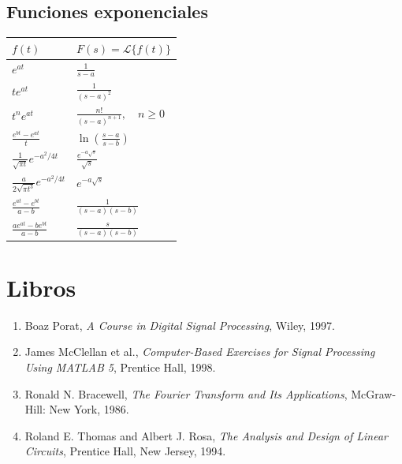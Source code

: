\subsection{Funciones exponenciales}

\begin{center}
	\renewcommand{\arraystretch}{1.8}
	\begin{tabular}{ll}
		\textbf{$f(t)$} & \textbf{$F(s) = \mathcal{L}\{f(t)\}$} \\ \hline
		$e^{at}$ & $\frac{1}{s-a}$ \\ 
		$t e^{at}$ & $\frac{1}{(s-a)^{2}}$ \\ 
		$t^n e^{at}$ & $\frac{n!}{(s-a)^{n+1}}, \quad n\geq 0$ \\ 
		$\frac{e^{bt}-e^{at}}{t}$ & $\ln \left( \frac{s-a}{s-b} \right)$ \\
		$\frac{1}{\sqrt{\pi t}}e^{-a^{2}/4t}$ & $\frac{e^{-a\sqrt{s}}}{\sqrt{s}}$ \\ 
		$\frac{a}{2\sqrt{\pi t^{3}}}e^{-a^{2}/4t}$ & $e^{-a\sqrt{s}}$ \\ 
		$\frac{e^{at}-e^{bt}}{a-b}$ & $\frac{1}{(s-a)(s-b)}$ \\ 
		$\frac{ae^{at}-be^{bt}}{a-b}$ & $\frac{s}{(s-a)(s-b)}$
	\end{tabular}
\end{center}


\section{Libros}
\begin{enumerate}
	
	\item Boaz Porat, 
	\textit{A Course in Digital Signal Processing}, 
	Wiley, 1997. 
	
	\item James McClellan et al., 
	\textit{Computer-Based Exercises for Signal Processing Using MATLAB 5},
	Prentice Hall, 1998.
	
	\item Ronald N. Bracewell, 
	\textit{The Fourier Transform and Its Applications},
	McGraw-Hill: New York, 1986.
	
	\item Roland E. Thomas and Albert J. Rosa, 
	\textit{The Analysis and Design of Linear Circuits},
	Prentice Hall, New Jersey, 1994.
	
\end{enumerate}